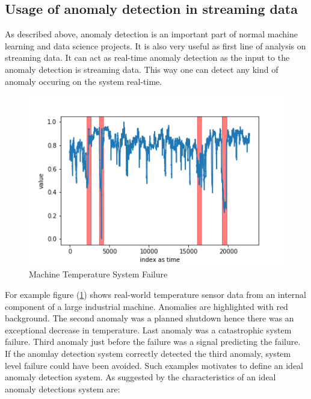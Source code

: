 \documentclass[12pt]{article}
\begin{document}
\subsection{Usage of anomaly detection in streaming data}
As described above, anomaly detection is an important part of normal machine learning and data science projects. It is also very useful as first line of analysis on streaming data. It can act as real-time anomaly detection as the input to the anomaly detection is streaming data. This way one can detect any kind of anomaly occuring on the system real-time.
\begin{figure}[H]
\centering
        \includegraphics[width=\textwidth]{images/dataAnomalies/known/machine_temperature_system_failure.png}
    \caption{Machine Temperature System Failure}
    \label{machineTemperatureSystemFailure}
\end{figure}
 For example figure (\ref{machineTemperatureSystemFailure}) shows real-world temperature sensor data from an internal component of a large industrial machine. Anomalies are highlighted with red background. The second anomaly was a planned shutdown  hence there was an exceptional decrease in temperature. Last anomaly was a catastrophic system failure. Third anomaly just before the failure was a signal predicting the failure. If the anomlay detection system correctly detected the third anomaly, system level failure could have been avoided. Such examples motivates to define an ideal anomaly detection system. As suggested by \cite{ahmad2017unsupervised} the characteristics of an ideal anomaly detections system are:
\end{document}
